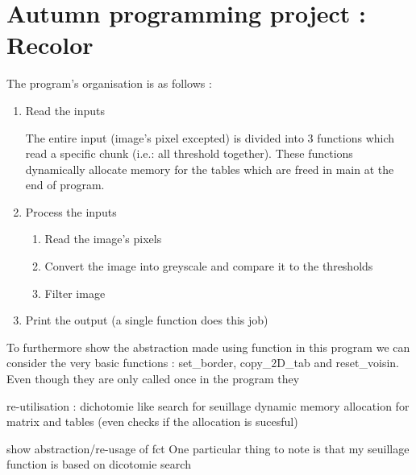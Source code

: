 \documentclass[a4paper]{report} %
\begin{document}
\section*{Autumn programming project : Recolor}
The program's organisation is as follows :
\begin{enumerate}
\item Read the inputs

The entire input (image's pixel excepted) is divided into 3 functions which read a specific chunk (i.e.: all threshold together).
These functions dynamically allocate memory for the tables which are freed in main at the end of program.

\item Process the inputs
    \begin{enumerate}
    \item Read the image's pixels
    \item Convert the image into greyscale and compare it to the thresholds
    \item Filter image
    \end{enumerate}
\item Print the output (a single function does this job)
\end{enumerate}

To furthermore show the abstraction made using function in this program we can consider the very basic functions : set\_border, copy\_2D\_tab and reset\_voisin.
Even though they are only called once in the program they 

re-utilisation :
dichotomie like search for seuillage
dynamic memory allocation for matrix and tables (even checks if the allocation is sucesful)

show abstraction/re-usage of fct
One particular thing to note is that my seuillage function is based on dicotomie search

\end{document}
